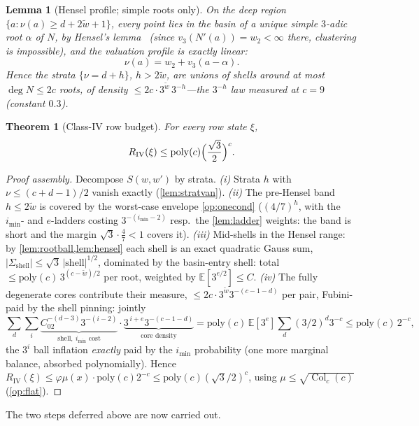 \documentclass[11pt]{article}
\newcommand{\E}{\mathbb{E}}
\theoremstyle{plain}
\newtheorem{theorem}{Theorem}
\newtheorem{lemma}{Lemma}
\theoremstyle{definition}
\theoremstyle{remark}
\begin{document}
\begin{lemma}[Hensel profile; simple roots only]\label{lem:hensel}
On the deep region $\{a:\nu(a)\ge d+2\tilde w+1\}$, every point lies in
the basin of a \emph{unique simple} $3$-adic root $\alpha$ of $N$, by
Hensel's lemma~\cite{gouvea2020} (since
$v_3(N'(a))=w_2<\infty$ there, clustering is impossible), and the
valuation profile is exactly linear:
\[
\nu(a)=w_2+v_3(a-\alpha).
\]
Hence the strata $\{\nu=d+h\}$, $h>2\tilde w$, are unions of shells
around at most $\deg N\le2c$ roots, of density
$\le2c\cdot3^{\tilde w}\,3^{-h}$---the $3^{-h}$ law measured at $c=9$
(constant $0.3$).
\end{lemma}

\begin{theorem}[Class-IV row budget]\label{thm:classfour}
For every row state $\xi$,
\[
R_{\mathrm{IV}}(\xi)\le\mathrm{poly}(c)\Bigl(\frac{\sqrt3}2\Bigr)^{c}.
\]
\end{theorem}

\begin{proof}[Proof assembly]
Decompose $S(w,w')$ by strata. \emph{(i)} Strata $h$ with
$\nu\le(c+d-1)/2$ vanish exactly (\cref{lem:stratvan}). \emph{(ii)} The
pre-Hensel band $h\le2\tilde w$ is covered by the worst-case envelope
\cref{op:onecond} ($(4/7)^h$, with the $i_{\min}$- and $e$-ladders
costing $3^{-(i_{\min}-2)}$ resp.\ the \cref{lem:ladder} weights: the
band is short and the margin $\sqrt3\cdot\tfrac47<1$ covers it).
\emph{(iii)} Mid-shells in the Hensel range: by
\cref{lem:rootball,lem:hensel} each shell is an exact quadratic Gauss
sum, $|\Sigma_{\mathrm{shell}}|\le\sqrt3\,|{\mathrm{shell}}|^{1/2}$,
dominated by the basin-entry shell: total
$\le\mathrm{poly}(c)\,3^{(c-\tilde w)/2}$ per root, weighted by
$\E[3^{e/2}]\le C$. \emph{(iv)} The fully degenerate cores contribute
their measure, $\le2c\cdot3^{\tilde w}3^{-(c-1-d)}$ per pair, Fubini-paid
by the shell pinning: jointly
\[
\sum_{d}\sum_{i}\underbrace{C_02^{-(d-3)}3^{-(i-2)}}_{\text{shell},\
i_{\min}\text{ cost}}\cdot
\underbrace{3^{\,i+e}3^{-(c-1-d)}}_{\text{core density}}
=\mathrm{poly}(c)\,\E[3^e]\sum_d(3/2)^{d}3^{-c}
\le\mathrm{poly}(c)\,2^{-c},
\]
the $3^{i}$ ball inflation \emph{exactly} paid by the $i_{\min}$
probability (one more marginal balance, absorbed polynomially). Hence
$R_{\mathrm{IV}}(\xi)\le\varphi\mu(x)\cdot\mathrm{poly}(c)2^{-c}
\le\mathrm{poly}(c)(\sqrt3/2)^c$, using
$\mu\le\sqrt{\operatorname{Col}_c(c)}$ (\cref{op:flat}).
\end{proof}

The two steps deferred above are now carried out.
\end{document}
